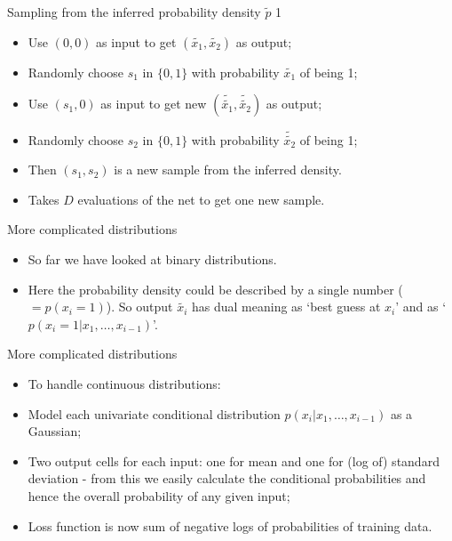 \documentclass[usenames,dvipsnames]{beamer}
\begin{document}
\begin{frame}{Sampling from the inferred probability density $\tilde{p}$ 1}
    \begin{itemize}
      \item{Use $(0, 0)$ as input to get $(\tilde{x_1}, \tilde{x_2})$ as output;}
	\item{Randomly choose $s_1$ in $\{0, 1\}$ with probability $\tilde{x_1}$ of being 1;}
	\item{Use $(s_1, 0)$ as input to get new $(\tilde{\tilde{x_1}}, \tilde{\tilde{x_2}})$ as output;}
	\item{Randomly choose $s_2$ in $\{0, 1\}$ with probability $\tilde{\tilde{x_2}}$ of being 1;}
	\item{Then $(s_1, s_2)$ is a new sample from the inferred density.}
	\item{Takes $D$ evaluations of the net to get one new sample.}
    \end{itemize}
\end{frame}


\begin{frame}{More complicated distributions}
    \begin{itemize}
      \item{So far we have looked at binary distributions.}
	\item{Here the probability density could be described by a single number ($= p(x_i = 1)$). So output $\tilde{x_i}$ has dual meaning as `best guess at $x_i$' and as `$p(x_i = 1 | x_1, \dots, x_{i-1})$'.}
    \end{itemize}
\end{frame}

\begin{frame}{More complicated distributions}
    \begin{itemize}
      \item{To handle continuous distributions:}
	\item{Model each univariate conditional distribution $p(x_i | x_1, \dots, x_{i-1})$ as a Gaussian;}
	\item{Two output cells for each input: one for mean and one for (log of) standard deviation - from this we easily calculate the conditional probabilities and hence the overall probability of any given input;}
	\item{Loss function is now sum of negative logs of probabilities of training data.}
    \end{itemize}
\end{frame}
\end{document}
